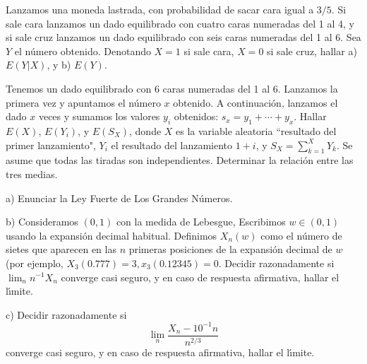 \begin{problem}[1] Lanzamos una moneda lastrada, con probabilidad de sacar cara
igual a $3/5$. Si sale cara lanzamos un dado equilibrado con cuatro
caras numeradas del 1 al 4, y si sale cruz lanzamos un dado
equilibrado con seis caras numeradas del 1 al 6. Sea $Y$ el n\'umero
obtenido. Denotando $X=1$ si sale cara, $X=0$ si sale cruz, hallar
a) $E(Y|X)$, y  b) $E(Y)$.
\solution

\begin{expla}

\end{expla}

\end{problem}


\begin{problem}[2] Tenemos un dado equilibrado con 6 caras numeradas del 1 al 6. Lanzamos la  primera vez y 
apuntamos el n\'umero $x$ obtenido. A continuaci\'on, 
lanzamos el dado $x$ veces y sumamos los valores $y_i$ obtenidos: $s_x = y_1 + \cdots  + y_x$.
Hallar $E(X)$, $E(Y_i)$, y $E(S_X)$, donde $X$ es la variable aleatoria ``resultado del primer lanzamiento", $Y_i$ el resultado del lanzamiento
$ 1 + i$, y $S_X = \sum_{k = 1}^X Y_k$. Se asume que todas
las tiradas son independientes. 
Determinar la relaci\'on entre las tres medias.
\solution

\begin{expla}

\end{expla}

\end{problem}


\begin{problem}[3] a) Enunciar la Ley Fuerte de Los Grandes N\'umeros.

b) Consideramos $(0,1)$ con la medida de Lebesgue, Escribimos $w\in (0,1)$ usando
la expansi\'on decimal habitual. Definimos $X_n(w)$ como el n\'umero de sietes que aparecen
en las $n$ primeras posiciones de la expansi\'on decimal de $w$ (por ejemplo, $X_3(0.777) = 3,
 x_3(0.12345) = 0$.  Decidir razonadamente si $\lim_n n^{-1}X_n$ converge casi seguro, y
 en caso de respuesta afirmativa, hallar el l\'{\i}mite.
 
 c) Decidir razonadamente si 
 $$
 \lim_n \frac{X_n - 10^{-1}n}{n^{2/3}}
 $$ 
 converge casi seguro, y
 en caso de respuesta afirmativa, hallar el l\'{\i}mite.
\solution

\begin{expla}

\end{expla}

\end{problem}

